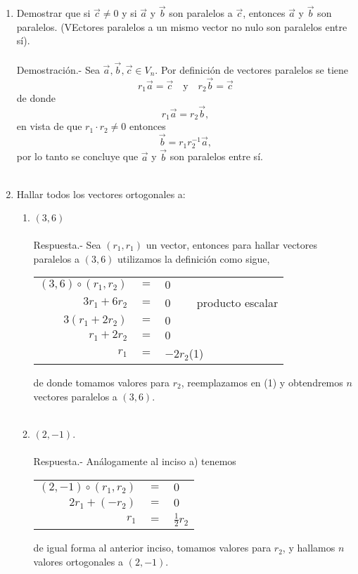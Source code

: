 \begin{enumerate}
\begin{enumerate}[\bfseries a)]
\end{enumerate}

\item Demostrar que si $\vec{c}\neq 0$ y si $\vec{a}$ y $\vec{b}$ son paralelos a $\vec{c}$, entonces $\vec{a}$ y $\vec{b}$ son paralelos. (VEctores paralelos a un mismo vector no nulo son paralelos entre sí).\\\\
    Demostración.-\; Sea $\vec{a},\vec{b},\vec{c}\in V_n$. Por definición de vectores paralelos se tiene $$r_1\vec{a}=\vec{c}\quad \mbox{y} \quad r_2\vec{b}=\vec{c}$$ de donde $$r_1\vec{a}=r_2\vec{b},$$ en vista de que $r_1\cdot r_2 \neq 0$ entonces $$\vec{b}=r_1r_2^{-1} \vec{a},$$ por lo tanto se concluye que $\vec{a}$ y $\vec{b}$ son paralelos entre sí.\\\\

\item Hallar todos los vectores ortogonales a:
\begin{enumerate}[\bfseries a)]
    
    \item $(3,6)$\\\\
	Respuesta.-\; Sea $(r_1,r_1)$ un vector, entonces para hallar vectores paralelos a $(3,6)$ utilizamos la definición como sigue,
	\begin{center}	
	    \begin{tabular}{rcl}
		$(3,6)\circ (r_1,r_2)$&$=$&$0$\\
		$3r_1+6r_2$&$=$&$0 \qquad$ producto escalar\\
		$3(r_1+2r_2)$&$=$&$0$\\
		$r_1+2r_2$&$=$&$0$\\
		$r_1$&$=$&$-2r_2$\qquad (1)\\
	    \end{tabular}
	\end{center}
	de donde tomamos valores para $r_2$, reemplazamos en (1) y obtendremos $n$ vectores paralelos a $(3,6)$.\\\\

    \item $(2,-1)$.\\\\
	Respuesta.-\; Análogamente al inciso a) tenemos 
	\begin{center}
	\begin{tabular}{rcl}
	    $(2,-1)\circ (r_1,r_2)$&$=$&$0$\\
	    $2r_1 + (-r_2)$&$=$&$0$\\
	    $r_1$&$=$&$\frac{1}{2}r_2$\\
	\end{tabular}
	\end{center}
	de igual forma al anterior inciso, tomamos valores para $r_2$, y hallamos $n$ valores ortogonales a $(2,-1)$.\\\\


\end{enumerate}
\end{enumerate}

